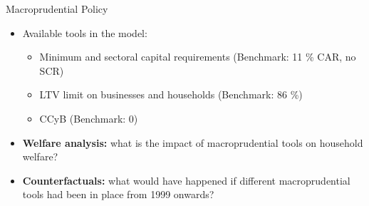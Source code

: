 \documentclass[8pt,aspectratio=169]{beamer}
\numberwithin{equation}{section}
\begin{document}
\begin{frame}{Macroprudential Policy}

\begin{itemize}

\item Available tools in the model: 
\vspace{3 mm}
\begin{itemize}
\item Minimum and sectoral capital requirements (Benchmark: 11 \% CAR, no SCR)
\vspace{3 mm}
\item LTV limit on businesses and households (Benchmark: 86 \%)
\vspace{3 mm}
\item CCyB (Benchmark: 0)
\end{itemize}

\pause

\vspace{10 mm}
\item \textbf{Welfare analysis:} what is the impact of macroprudential tools on household welfare? 
\vspace{5 mm}
\item \textbf{Counterfactuals:} what would have happened if different macroprudential tools had been in place from 1999 onwards? 

\end{itemize}
\end{frame}
\end{document}
